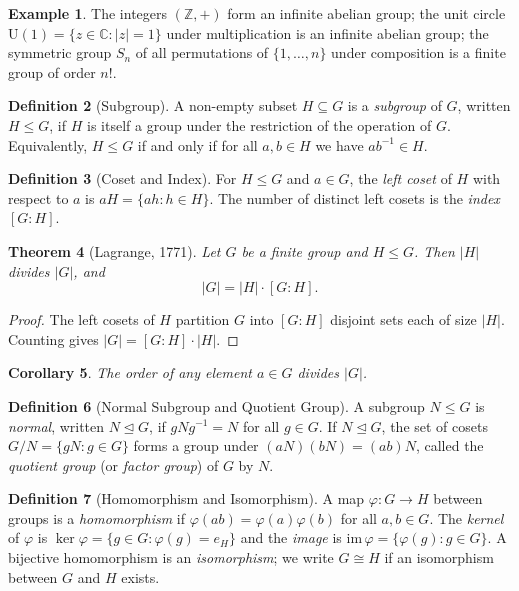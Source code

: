 \documentclass[12pt,a4paper]{amsart}
\newtheorem{theorem}{Theorem}[section]
\newtheorem{corollary}[theorem]{Corollary}
\theoremstyle{definition}
\newtheorem{definition}[theorem]{Definition}
\newtheorem{example}[theorem]{Example}
\begin{document}
\begin{example}
The integers $(\mathbb{Z}, +)$ form an infinite abelian group; the unit circle
$\mathrm{U}(1) = \{z \in \mathbb{C} : |z| = 1\}$ under multiplication is an infinite
abelian group; the symmetric group $S_n$ of all permutations of $\{1, \ldots, n\}$
under composition is a finite group of order $n!$.
\end{example}

\begin{definition}[Subgroup]
A non-empty subset $H \subseteq G$ is a \emph{subgroup} of $G$, written $H \leq G$,
if $H$ is itself a group under the restriction of the operation of $G$. Equivalently,
$H \leq G$ if and only if for all $a, b \in H$ we have $ab^{-1} \in H$.
\end{definition}

\begin{definition}[Coset and Index]
For $H \leq G$ and $a \in G$, the \emph{left coset} of $H$ with respect to $a$ is
$aH = \{ah : h \in H\}$. The number of distinct left cosets is the \emph{index}
$[G : H]$.
\end{definition}

\begin{theorem}[Lagrange, 1771]
\label{thm:lagrange}
Let $G$ be a finite group and $H \leq G$. Then $|H|$ divides $|G|$, and
\[
  |G| = |H| \cdot [G : H].
\]
\end{theorem}

\begin{proof}
The left cosets of $H$ partition $G$ into $[G:H]$ disjoint sets each of size $|H|$.
Counting gives $|G| = [G:H] \cdot |H|$.
\end{proof}

\begin{corollary}
The order of any element $a \in G$ divides $|G|$.
\end{corollary}

\begin{definition}[Normal Subgroup and Quotient Group]
A subgroup $N \leq G$ is \emph{normal}, written $N \trianglelefteq G$, if
$gNg^{-1} = N$ for all $g \in G$. If $N \trianglelefteq G$, the set of cosets
$G/N = \{gN : g \in G\}$ forms a group under $(aN)(bN) = (ab)N$, called the
\emph{quotient group} (or \emph{factor group}) of $G$ by $N$.
\end{definition}

\begin{definition}[Homomorphism and Isomorphism]
A map $\varphi : G \to H$ between groups is a \emph{homomorphism} if
$\varphi(ab) = \varphi(a)\varphi(b)$ for all $a,b \in G$. The \emph{kernel}
of $\varphi$ is $\ker\varphi = \{g \in G : \varphi(g) = e_H\}$ and the
\emph{image} is $\mathrm{im}\,\varphi = \{\varphi(g) : g \in G\}$.
A bijective homomorphism is an \emph{isomorphism}; we write $G \cong H$ if
an isomorphism between $G$ and $H$ exists.
\end{definition}
\end{document}
